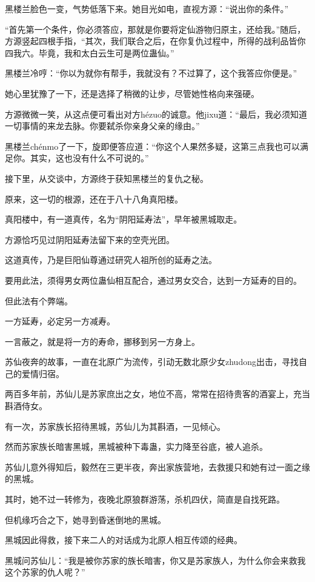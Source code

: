 \begin{this_body}
黑楼兰脸色一变，气势低落下来。她目光如电，直视方源：“说出你的条件。”

“首先第一个条件，你必须答应，那就是你要将定仙游物归原主，还给我。”随后，方源竖起四根手指，“其次，我们联合之后，在你复仇过程中，所得的战利品皆你四我六。毕竟，我和太白云生可是两位蛊仙。”

黑楼兰冷哼：“你以为就你有帮手，我就没有？不过算了，这个我答应你便是。”

她心里犹豫了一下，还是选择了稍微的让步，尽管她性格向来强硬。

方源微微一笑，从这点便可看出对方hézuo的诚意。他jixu道：“最后，我必须知道一切事情的来龙去脉。你要弑杀你亲身父亲的缘由。”

黑楼兰chénmo了一下，旋即便答应道：“你这个人果然多疑，这第三点我也可以满足你。其实，这也没有什么不可说的。”

接下里，从交谈中，方源终于获知黑楼兰的复仇之秘。

原来，这一切的根源，还在于八十八角真阳楼。

真阳楼中，有一道真传，名为“阴阳延寿法”，早年被黑城取走。

方源恰巧见过阴阳延寿法留下来的空壳光团。

这道真传，乃是巨阳仙尊通过研究人祖所创的延寿之法。

要用此法，须得男女两位蛊仙相互配合，通过男女交合，达到一方延寿的目的。

但此法有个弊端。

一方延寿，必定另一方减寿。

一言蔽之，就是将一方的寿命，挪移到另一方身上。

苏仙夜奔的故事，一直在北原广为流传，引动无数北原少女zhudong出击，寻找自己的爱情归宿。

两百多年前，苏仙儿是苏家庶出之女，地位不高，常常在招待贵客的酒宴上，充当斟酒侍女。

有一次，苏家族长招待黑城，苏仙儿为其斟酒，一见倾心。

然而苏家族长暗害黑城，黑城被种下毒蛊，实力降至谷底，被人追杀。

苏仙儿意外得知后，毅然在三更半夜，奔出家族营地，去救援只和她有过一面之缘的黑城。

其时，她不过一转修为，夜晚北原狼群游荡，杀机四伏，简直是自找死路。

但机缘巧合之下，她寻到昏迷倒地的黑城。

黑城因此得救，接下来二人的对话成为北原人相互传颂的经典。

黑城问苏仙儿：“我是被你苏家的族长暗害，你又是苏家族人，为什么你会来救我这个苏家的仇人呢？”


\end{this_body}
